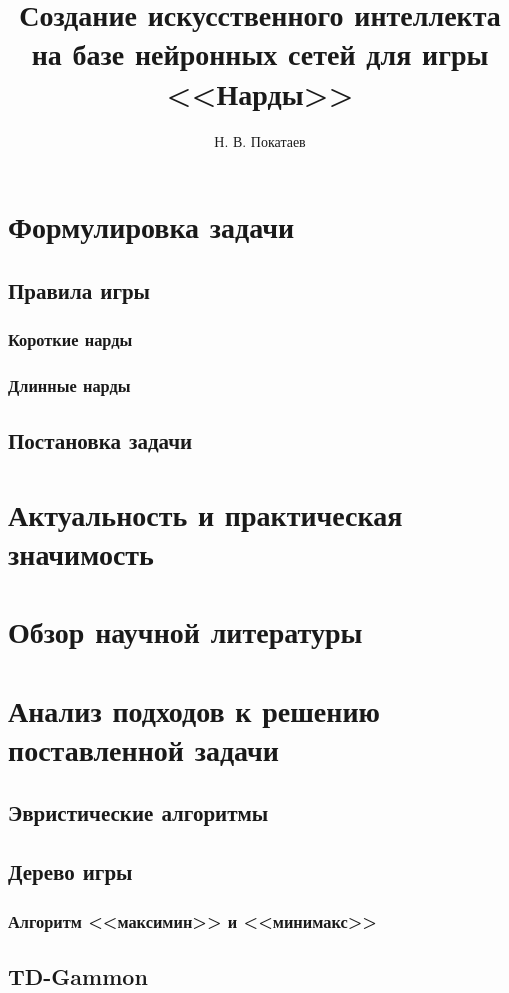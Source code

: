 \documentclass{vsureport}
\title{Создание искусственного интеллекта на базе нейронных сетей для игры <<Нарды>>}
\author{Н. В. Покатаев}
\begin{document}
\maketitle

\tableofcontents



\section{Формулировка задачи}


\subsection{Правила игры}


\subsubsection{Короткие нарды}


\subsubsection{Длинные нарды}


\subsection{Постановка задачи}


\section{Актуальность и практическая значимость}


\section{Обзор научной литературы}


\section{Анализ подходов к решению поставленной задачи}

\subsection{Эвристические алгоритмы}


\subsection{Дерево игры}


\subsubsection{Алгоритм <<максимин>> и <<минимакс>>}


\subsection{TD-Gammon}





\end{document}
